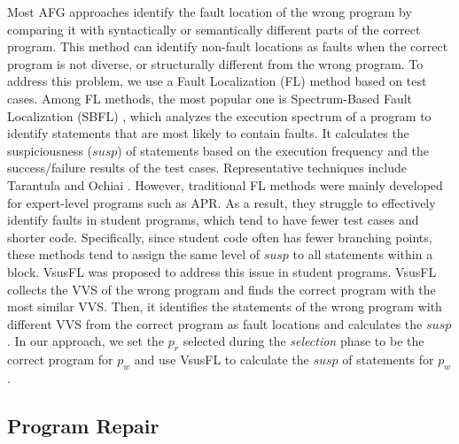 \documentclass[10pt,conference]{IEEEtran}
\begin{document}
        Most AFG approaches \cite{singh2013automated, d2016qlose, gulwani2018automated, wang2018search, hu2019re} identify the fault location of the wrong program by comparing it with syntactically or semantically different parts of the correct program. This method can identify non-fault locations as faults when the correct program is not diverse, or structurally different from the wrong program. To address this problem, we use a Fault Localization (FL) method based on test cases. Among FL methods, the most popular one is Spectrum-Based Fault Localization (SBFL) \cite{abreu2009spectrum}, which analyzes the execution spectrum of a program to identify statements that are most likely to contain faults. It calculates the suspiciousness ($susp$) of statements based on the execution frequency and the success/failure results of the test cases. Representative techniques include Tarantula \cite{jones2001visualization} and Ochiai \cite{abreu2006evaluation}. However, traditional FL methods were mainly developed for expert-level programs such as APR. As a result, they struggle to effectively identify faults in student programs, which tend to have fewer test cases and shorter code. Specifically, since student code often has fewer branching points, these methods tend to assign the same level of $susp$ to all statements within a block. VsusFL \cite{li2023vsusfl} was proposed to address this issue in student programs. VsusFL collects the VVS of the wrong program and finds the correct program with the most similar VVS. Then, it identifies the statements of the wrong program with different VVS from the correct program as fault locations and calculates the $susp$. In our approach, we set the $p_{r}$ selected during the \textit{selection} phase to be the correct program for $p_{w}$ and use VsusFL to calculate the $susp$ of statements for $p_{w}$.


    \subsection{Program Repair}\label{programRepair}
\end{document}
